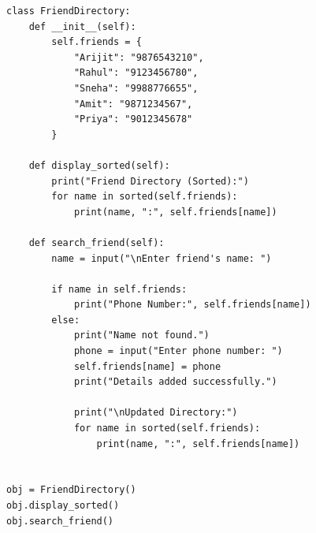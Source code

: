 \begin{verbatim}
class FriendDirectory:
    def __init__(self):
        self.friends = {
            "Arijit": "9876543210",
            "Rahul": "9123456780",
            "Sneha": "9988776655",
            "Amit": "9871234567",
            "Priya": "9012345678"
        }

    def display_sorted(self):
        print("Friend Directory (Sorted):")
        for name in sorted(self.friends):
            print(name, ":", self.friends[name])

    def search_friend(self):
        name = input("\nEnter friend's name: ")

        if name in self.friends:
            print("Phone Number:", self.friends[name])
        else:
            print("Name not found.")
            phone = input("Enter phone number: ")
            self.friends[name] = phone
            print("Details added successfully.")

            print("\nUpdated Directory:")
            for name in sorted(self.friends):
                print(name, ":", self.friends[name])


obj = FriendDirectory()
obj.display_sorted()
obj.search_friend()
\end{verbatim}